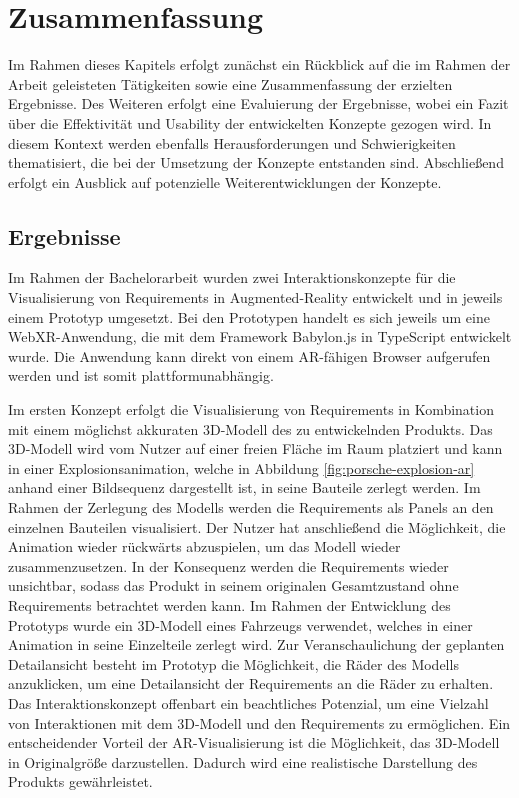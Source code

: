 \chapter{Zusammenfassung}

Im Rahmen dieses Kapitels erfolgt zunächst ein Rückblick auf die im Rahmen der Arbeit geleisteten Tätigkeiten sowie eine Zusammenfassung der erzielten Ergebnisse.
Des Weiteren erfolgt eine Evaluierung der Ergebnisse, wobei ein Fazit über die Effektivität und Usability der entwickelten Konzepte gezogen wird.
In diesem Kontext werden ebenfalls Herausforderungen und Schwierigkeiten thematisiert, die bei der Umsetzung der Konzepte entstanden sind.
Abschließend erfolgt ein Ausblick auf potenzielle Weiterentwicklungen der Konzepte.

\section{Ergebnisse}

Im Rahmen der Bachelorarbeit wurden zwei Interaktionskonzepte für die Visualisierung von Requirements in Augmented-Reality entwickelt und in jeweils einem Prototyp umgesetzt.
Bei den Prototypen handelt es sich jeweils um eine WebXR-Anwendung, die mit dem Framework Babylon.js in TypeScript entwickelt wurde.
Die Anwendung kann direkt von einem AR-fähigen Browser aufgerufen werden und ist somit plattformunabhängig.

Im ersten Konzept erfolgt die Visualisierung von Requirements in Kombination mit einem möglichst akkuraten 3D-Modell des zu entwickelnden Produkts.
Das 3D-Modell wird vom Nutzer auf einer freien Fläche im Raum platziert und kann in einer Explosionsanimation, welche in Abbildung \ref{fig:porsche-explosion-ar} anhand einer Bildsequenz dargestellt ist, in seine Bauteile zerlegt werden.
Im Rahmen der Zerlegung des Modells werden die Requirements als Panels an den einzelnen Bauteilen visualisiert.
Der Nutzer hat anschließend die Möglichkeit, die Animation wieder rückwärts abzuspielen, um das Modell wieder zusammenzusetzen.
In der Konsequenz werden die Requirements wieder unsichtbar, sodass das Produkt in seinem originalen Gesamtzustand ohne Requirements betrachtet werden kann.
Im Rahmen der Entwicklung des Prototyps wurde ein 3D-Modell eines Fahrzeugs verwendet, welches in einer Animation in seine Einzelteile zerlegt wird.
Zur Veranschaulichung der geplanten Detailansicht besteht im Prototyp die Möglichkeit, die Räder des Modells anzuklicken, um eine Detailansicht der Requirements an die Räder zu erhalten.
Das Interaktionskonzept offenbart ein beachtliches Potenzial, um eine Vielzahl von Interaktionen mit dem 3D-Modell und den Requirements zu ermöglichen.
Ein entscheidender Vorteil der AR-Visualisierung ist die Möglichkeit, das 3D-Modell in Originalgröße darzustellen.
Dadurch wird eine realistische Darstellung des Produkts gewährleistet.

